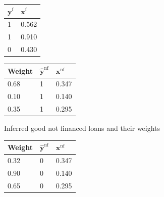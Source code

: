\begin{table}
\caption{\label{fuzzyexample} Example of implementation of the Fuzzy Augmentation method on a small dataset}
{\setlength{\parindent}{0cm}
\begin{multicols}{4}
\small

\begin{subfigure}[t]{0.22\textwidth}
\begin{center}
\begin{adjustbox}{max width=0.95\textwidth}
\begin{tabular}{l l}
\toprule
\textbf{${\bm{y}}^{\text{f}}$} & \textbf{${\bm{x}}^{\text{f}}$}\\
\midrule
1 & 0.562 \\
1 & 0.910 \\
0 & 0.430 \\
\bottomrule
\end{tabular}
\end{adjustbox}
\end{center}

\label{fuzzy:sfig1}
\end{subfigure}

\columnbreak

\begin{subfigure}[t]{0.22\textwidth}
\begin{center}
\begin{adjustbox}{max width=0.95\textwidth}
\begin{tabular}{l l l}
\toprule
\textbf{Weight} & \textbf{$\hat{\bm{y}}^{\text{nf}}$} & \textbf{${\bm{x}}^{\text{nf}}$}\\
\midrule
0.68 & 1 & 0.347 \\
0.10 & 1 & 0.140 \\
0.35 & 1 & 0.295 \\
\bottomrule
\end{tabular}
\end{adjustbox}
\end{center}

\caption{Inferred good not financed loans and their weights}
\label{fuzzy:sfig2}
\end{subfigure}

\columnbreak

\begin{subfigure}[t]{0.22\textwidth}
\begin{center}
\begin{adjustbox}{max width=0.95\textwidth}
\begin{tabular}{l l l}
\toprule
\textbf{Weight} & \textbf{$\hat{\bm{y}}^{\text{nf}}$} & \textbf{${\bm{x}}^{\text{nf}}$}\\
\midrule
0.32 & 0 & 0.347 \\
0.90 & 0 & 0.140 \\
0.65 & 0 & 0.295 \\
\bottomrule
\end{tabular}
\end{adjustbox}
\end{center}


\end{subfigure}
\end{multicols}}
\end{table}
